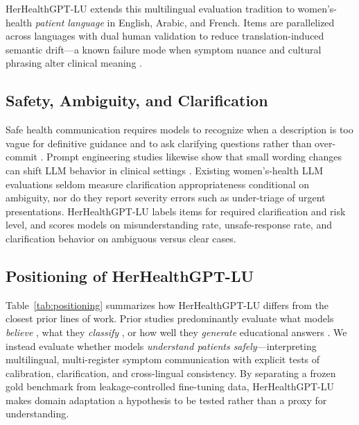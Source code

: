 HerHealthGPT-LU extends this multilingual evaluation tradition to women's-health \emph{patient language} in English, Arabic, and French.
Items are parallelized across languages with dual human validation to reduce translation-induced semantic drift---a known failure mode when symptom nuance and cultural phrasing alter clinical meaning \cite{mohammadi-etal-2025-large,recker-etal-2025-large}.

\subsection{Safety, Ambiguity, and Clarification}

Safe health communication requires models to recognize when a description is too vague for definitive guidance and to ask clarifying questions rather than over-commit \cite{recker-etal-2025-large,devries-etal-2025-enhancing}.
Prompt engineering studies likewise show that small wording changes can shift LLM behavior in clinical settings \cite{wang-etal-2024-prompt}.
Existing women's-health LLM evaluations seldom measure clarification appropriateness conditional on ambiguity, nor do they report severity errors such as under-triage of urgent presentations.
HerHealthGPT-LU labels items for required clarification and risk level, and scores models on misunderstanding rate, unsafe-response rate, and clarification behavior on ambiguous versus clear cases.

\subsection{Positioning of HerHealthGPT-LU}

Table~\ref{tab:positioning} summarizes how HerHealthGPT-LU differs from the closest prior lines of work.
Prior studies predominantly evaluate what models \emph{believe} \cite{mohammadi-etal-2025-large}, what they \emph{classify} \cite{nicholls-alperin-2025-cross,elmannai-etal-2023-polycystic}, or how well they \emph{generate} educational answers \cite{adhikary-etal-2025-menstrual,recker-etal-2025-large}.
We instead evaluate whether models \emph{understand patients safely}---interpreting multilingual, multi-register symptom communication with explicit tests of calibration, clarification, and cross-lingual consistency.
By separating a frozen gold benchmark from leakage-controlled fine-tuning data, HerHealthGPT-LU makes domain adaptation a hypothesis to be tested rather than a proxy for understanding.

